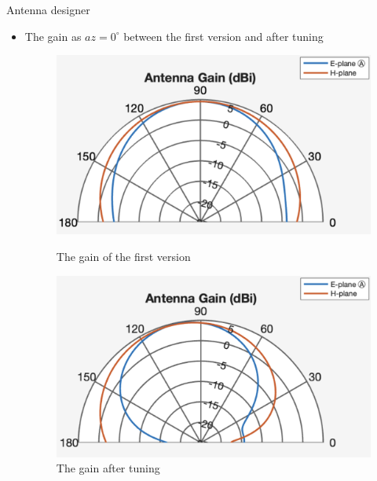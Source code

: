 \documentclass{beamer}
\begin{document}
\begin{frame}[t]{Antenna designer}
	\begin{itemize}
	    \item The gain as $az=0^{\circ}$ between the first version and after tuning
        \vspace{1.0\baselineskip}
            \begin{figure}
                \centering
                \begin{minipage}{0.45\textwidth}
                    \centering
                    \includegraphics[height=0.55\textwidth]{figures/antenna_gain_optimization.png}
                    \caption{The gain of the first version}
                \end{minipage}
                \begin{minipage}{0.45\textwidth}
                    \centering
                    \includegraphics[height=0.55\textwidth]{figures/antenna_gain_latest.png}
                    \caption{The gain after tuning}
                \end{minipage}
            \end{figure}
	\end{itemize}
\end{frame}
\end{document}
